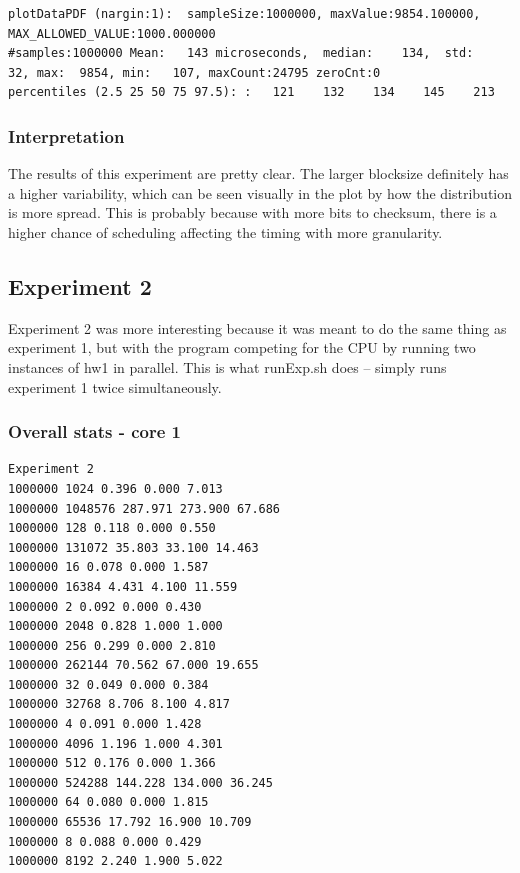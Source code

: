 \documentclass{article}
\begin{document}
\begin{lstlisting}
plotDataPDF (nargin:1):  sampleSize:1000000, maxValue:9854.100000,  MAX_ALLOWED_VALUE:1000.000000
#samples:1000000 Mean:   143 microseconds,  median:    134,  std:     32, max:  9854, min:   107, maxCount:24795 zeroCnt:0
percentiles (2.5 25 50 75 97.5): :   121    132    134    145    213
\end{lstlisting}

\subsubsection{Interpretation}

The results of this experiment are pretty clear. The larger blocksize definitely
has a higher variability, which can be seen visually in the plot by how the
distribution is more spread. This is probably because with more bits to
checksum, there is a higher chance of scheduling affecting the timing with more
granularity.

\subsection{Experiment 2}

Experiment 2 was more interesting because it was meant to do the same thing as
experiment 1, but with the program competing for the CPU by running two
instances of hw1 in parallel. This is what runExp.sh does -- simply runs
experiment 1 twice simultaneously.

\subsubsection{Overall stats - core 1}

\begin{lstlisting}
Experiment 2
1000000 1024 0.396 0.000 7.013
1000000 1048576 287.971 273.900 67.686
1000000 128 0.118 0.000 0.550
1000000 131072 35.803 33.100 14.463
1000000 16 0.078 0.000 1.587
1000000 16384 4.431 4.100 11.559
1000000 2 0.092 0.000 0.430
1000000 2048 0.828 1.000 1.000
1000000 256 0.299 0.000 2.810
1000000 262144 70.562 67.000 19.655
1000000 32 0.049 0.000 0.384
1000000 32768 8.706 8.100 4.817
1000000 4 0.091 0.000 1.428
1000000 4096 1.196 1.000 4.301
1000000 512 0.176 0.000 1.366
1000000 524288 144.228 134.000 36.245
1000000 64 0.080 0.000 1.815
1000000 65536 17.792 16.900 10.709
1000000 8 0.088 0.000 0.429
1000000 8192 2.240 1.900 5.022
\end{lstlisting}
\end{document}
